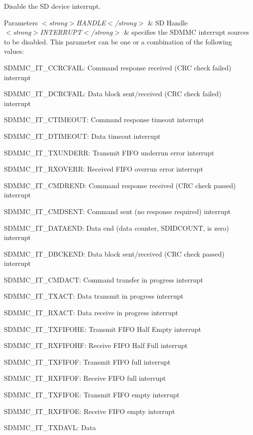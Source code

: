Disable the SD device interrupt. 


\begin{DoxyParams}{Parameters}
{\em $<$strong$>$\+H\+A\+N\+D\+L\+E$<$/strong$>$} & SD Handle\\
\hline
{\em $<$strong$>$\+I\+N\+T\+E\+R\+R\+U\+P\+T$<$/strong$>$} & specifies the S\+D\+M\+MC interrupt sources to be disabled. This parameter can be one or a combination of the following values\+: \begin{DoxyItemize}
\item S\+D\+M\+M\+C\+\_\+\+I\+T\+\_\+\+C\+C\+R\+C\+F\+A\+IL\+: Command response received (C\+RC check failed) interrupt \item S\+D\+M\+M\+C\+\_\+\+I\+T\+\_\+\+D\+C\+R\+C\+F\+A\+IL\+: Data block sent/received (C\+RC check failed) interrupt \item S\+D\+M\+M\+C\+\_\+\+I\+T\+\_\+\+C\+T\+I\+M\+E\+O\+UT\+: Command response timeout interrupt \item S\+D\+M\+M\+C\+\_\+\+I\+T\+\_\+\+D\+T\+I\+M\+E\+O\+UT\+: Data timeout interrupt \item S\+D\+M\+M\+C\+\_\+\+I\+T\+\_\+\+T\+X\+U\+N\+D\+E\+RR\+: Transmit F\+I\+FO underrun error interrupt \item S\+D\+M\+M\+C\+\_\+\+I\+T\+\_\+\+R\+X\+O\+V\+E\+RR\+: Received F\+I\+FO overrun error interrupt \item S\+D\+M\+M\+C\+\_\+\+I\+T\+\_\+\+C\+M\+D\+R\+E\+ND\+: Command response received (C\+RC check passed) interrupt \item S\+D\+M\+M\+C\+\_\+\+I\+T\+\_\+\+C\+M\+D\+S\+E\+NT\+: Command sent (no response required) interrupt \item S\+D\+M\+M\+C\+\_\+\+I\+T\+\_\+\+D\+A\+T\+A\+E\+ND\+: Data end (data counter, S\+D\+I\+D\+C\+O\+U\+NT, is zero) interrupt \item S\+D\+M\+M\+C\+\_\+\+I\+T\+\_\+\+D\+B\+C\+K\+E\+ND\+: Data block sent/received (C\+RC check passed) interrupt \item S\+D\+M\+M\+C\+\_\+\+I\+T\+\_\+\+C\+M\+D\+A\+CT\+: Command transfer in progress interrupt \item S\+D\+M\+M\+C\+\_\+\+I\+T\+\_\+\+T\+X\+A\+CT\+: Data transmit in progress interrupt \item S\+D\+M\+M\+C\+\_\+\+I\+T\+\_\+\+R\+X\+A\+CT\+: Data receive in progress interrupt \item S\+D\+M\+M\+C\+\_\+\+I\+T\+\_\+\+T\+X\+F\+I\+F\+O\+HE\+: Transmit F\+I\+FO Half Empty interrupt \item S\+D\+M\+M\+C\+\_\+\+I\+T\+\_\+\+R\+X\+F\+I\+F\+O\+HF\+: Receive F\+I\+FO Half Full interrupt \item S\+D\+M\+M\+C\+\_\+\+I\+T\+\_\+\+T\+X\+F\+I\+F\+OF\+: Transmit F\+I\+FO full interrupt \item S\+D\+M\+M\+C\+\_\+\+I\+T\+\_\+\+R\+X\+F\+I\+F\+OF\+: Receive F\+I\+FO full interrupt \item S\+D\+M\+M\+C\+\_\+\+I\+T\+\_\+\+T\+X\+F\+I\+F\+OE\+: Transmit F\+I\+FO empty interrupt \item S\+D\+M\+M\+C\+\_\+\+I\+T\+\_\+\+R\+X\+F\+I\+F\+OE\+: Receive F\+I\+FO empty interrupt \item S\+D\+M\+M\+C\+\_\+\+I\+T\+\_\+\+T\+X\+D\+A\+VL\+: Data 
\end{DoxyItemize}
\end{DoxyParams}
